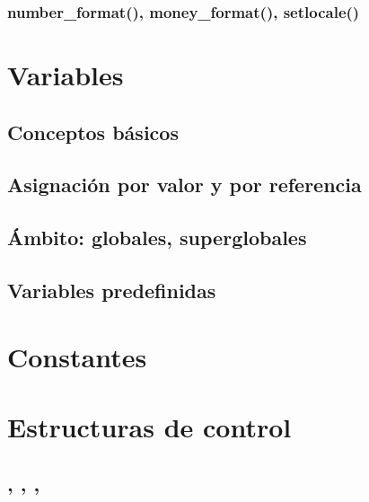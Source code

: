 \documentclass[a4paper,11pt,spanish]{sphinxmanual}
\begin{document}
\subsection{number\_format(), money\_format(), setlocale()}
\label{\detokenize{conceptos-basicos-de-php:number-format-money-format-setlocale}}

\chapter{Variables}
\label{\detokenize{conceptos-basicos-de-php:variables}}

\section{Conceptos básicos}
\label{\detokenize{conceptos-basicos-de-php:conceptos-basicos}}

\section{Asignación por valor y por referencia}
\label{\detokenize{conceptos-basicos-de-php:asignacion-por-valor-y-por-referencia}}

\section{Ámbito: globales, superglobales}
\label{\detokenize{conceptos-basicos-de-php:ambito-globales-superglobales}}

\section{Variables predefinidas}
\label{\detokenize{conceptos-basicos-de-php:variables-predefinidas}}

\chapter{Constantes}
\label{\detokenize{conceptos-basicos-de-php:constantes}}

\chapter{Estructuras de control}
\label{\detokenize{conceptos-basicos-de-php:estructuras-de-control}}

\section{, , , }
\label{\detokenize{conceptos-basicos-de-php:require-require-once-include-include-once}}
\end{document}
